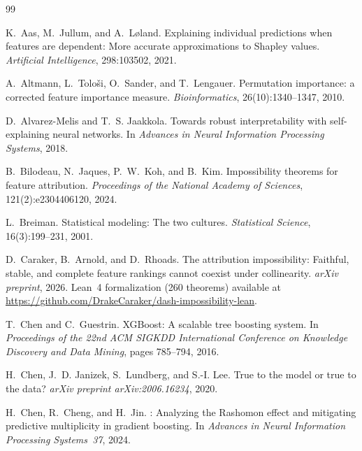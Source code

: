 \documentclass[11pt]{article}
\begin{document}
\begin{thebibliography}{99}

K.~Aas, M.~Jullum, and A.~L{\o}land.
\newblock Explaining individual predictions when features are dependent:
  More accurate approximations to {S}hapley values.
\newblock \emph{Artificial Intelligence}, 298:103502, 2021.

A.~Altmann, L.~Tolo{\v{s}}i, O.~Sander, and T.~Lengauer.
\newblock Permutation importance: a corrected feature importance measure.
\newblock \emph{Bioinformatics}, 26(10):1340--1347, 2010.

D.~Alvarez-Melis and T.~S. Jaakkola.
\newblock Towards robust interpretability with self-explaining neural networks.
\newblock In \emph{Advances in Neural Information Processing Systems}, 2018.

B.~Bilodeau, N.~Jaques, P.~W.~Koh, and B.~Kim.
\newblock Impossibility theorems for feature attribution.
\newblock \emph{Proceedings of the National Academy of Sciences},
  121(2):e2304406120, 2024.

L.~Breiman.
\newblock Statistical modeling: The two cultures.
\newblock \emph{Statistical Science}, 16(3):199--231, 2001.

D.~Caraker, B.~Arnold, and D.~Rhoads.
\newblock The attribution impossibility: Faithful, stable, and complete
  feature rankings cannot coexist under collinearity.
\newblock \emph{arXiv preprint}, 2026. Lean~4 formalization (260 theorems)
  available at \url{https://github.com/DrakeCaraker/dash-impossibility-lean}.

T.~Chen and C.~Guestrin.
\newblock XGBoost: A scalable tree boosting system.
\newblock In \emph{Proceedings of the 22nd ACM SIGKDD International Conference
  on Knowledge Discovery and Data Mining}, pages 785--794, 2016.

H.~Chen, J.~D. Janizek, S.~Lundberg, and S.-I. Lee.
\newblock True to the model or true to the data?
\newblock \emph{arXiv preprint arXiv:2006.16234}, 2020.

H.~Chen, R.~Cheng, and H.~Jin.
: Analyzing the {R}ashomon effect and mitigating
  predictive multiplicity in gradient boosting.
\newblock In \emph{Advances in Neural Information Processing Systems~37}, 2024.


\end{thebibliography}
\end{document}
